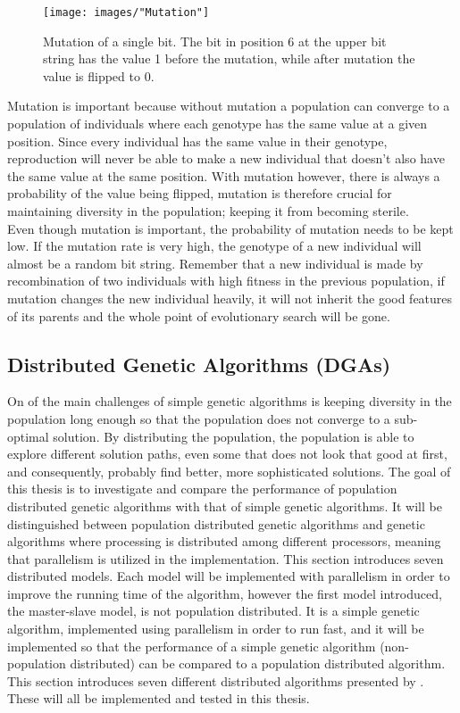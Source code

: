 \begin{figure}[h!]
\begin{center}
\texttt{[image: images/"Mutation"]}
\caption{Mutation of a single bit. The bit in position 6 at the upper bit string has the value 1 before the mutation, while after mutation the value is flipped to 0.}
\label{Mutation}
\end{center}
\end{figure}


\noindent Mutation is important because without mutation a population can converge to a population of individuals where each genotype has the same value at a given position. Since every individual has the same value in their genotype, reproduction will never be able to make a new individual that doesn't also have the same value at the same position. With mutation however, there is always a probability of the value being flipped, mutation is therefore crucial for maintaining diversity in the population; keeping it from becoming sterile.\\


\noindent Even though mutation is important, the probability of mutation needs to be kept low. If the mutation rate is very high, the genotype of a new individual will almost be a random bit string. Remember that a new individual is made by recombination of two individuals with high fitness in the previous population, if mutation changes the new individual heavily, it will not inherit the good features of its parents and the whole point of evolutionary search will be gone.\\


\subsection{Distributed Genetic Algorithms (DGAs)}\label{subsection:dga}
On of the main challenges of simple genetic algorithms is keeping diversity in the population long enough so that the population does not converge to a sub-optimal solution. By distributing the population, the population is able to explore different solution paths, even some that does not look that good at first, and consequently, probably find better, more sophisticated solutions. The goal of this thesis is to investigate and compare the performance of population distributed genetic algorithms with that of simple genetic algorithms. It will be distinguished between population distributed genetic algorithms and genetic algorithms where processing is distributed among different processors, meaning that parallelism is utilized in the implementation. This section introduces seven distributed models. Each model will be implemented with parallelism in order to improve the running time of the algorithm, however the first model introduced, the master-slave model, is not population distributed. It is a simple genetic algorithm, implemented using parallelism in order to run fast, and it will be implemented so that the performance of a simple genetic algorithm (non-population distributed) can be compared to a population distributed algorithm. This section introduces seven different distributed algorithms presented by \cite{Gong}. These will all be implemented and tested in this thesis.\\



